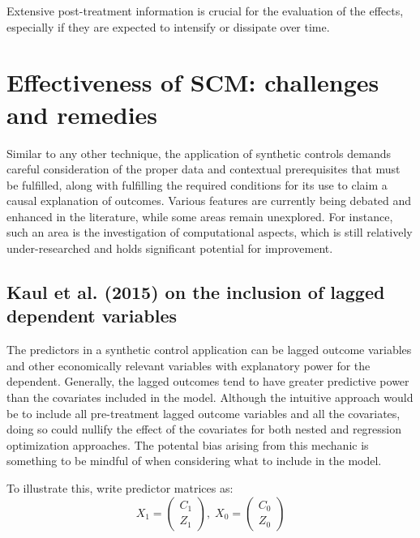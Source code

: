 \documentclass[12pt,a4paper,draft]{article}
\begin{document}
Extensive post-treatment information is crucial for the evaluation of the effects, 
especially if they are expected to intensify or dissipate over time.





\section{Effectiveness of SCM: challenges and remedies}

Similar to any other technique, the application of synthetic controls demands 
careful consideration of the proper data and contextual prerequisites that must be 
fulfilled, along with fulfilling the required conditions for its use to claim a 
causal explanation of outcomes. Various features are currently being debated and 
enhanced in the literature, while some areas remain unexplored. 
For instance, such an area is the investigation of computational aspects, 
which is still relatively under-researched and holds significant potential for 
improvement.



\subsection{Kaul et al. (2015) on the inclusion of lagged dependent variables}

The predictors in a synthetic control application can be lagged outcome variables and other 
economically relevant variables with explanatory power for the dependent. Generally, 
the lagged outcomes tend to have greater predictive power than the covariates included 
in the model. 
Although the intuitive approach would be to include all pre-treatment lagged outcome 
variables and all the covariates, doing so could nullify the effect of the covariates 
for both nested and regression optimization approaches. The potental bias arising 
from this mechanic is something to be mindful of when considering what to include 
in the model.

To illustrate this, write predictor matrices as:
\begin{equation}
    X_1 = \left( \begin{matrix} C_1 \\ Z_1 \end{matrix} \right), \;
    X_0 = \left( \begin{matrix} C_0 \\ Z_0 \end{matrix} \right)
\end{equation}
\end{document}
